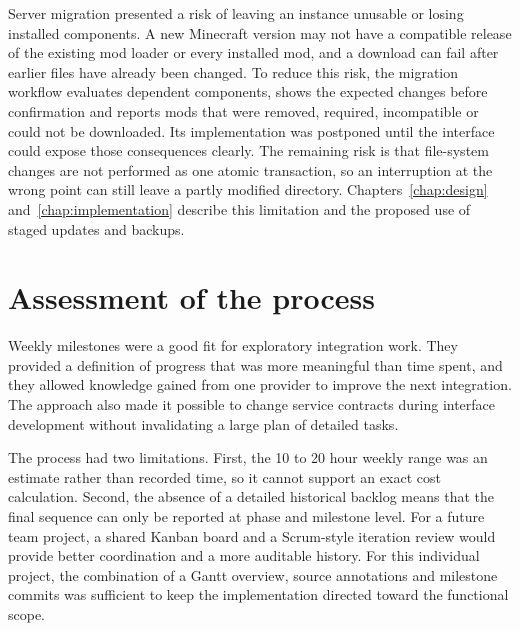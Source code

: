 Server migration presented a risk of leaving an instance unusable or losing installed components. A new Minecraft version may not have a compatible release of the existing mod loader or every installed mod, and a download can fail after earlier files have already been changed. To reduce this risk, the migration workflow evaluates dependent components, shows the expected changes before confirmation and reports mods that were removed, required, incompatible or could not be downloaded. Its implementation was postponed until the interface could expose those consequences clearly. The remaining risk is that file-system changes are not performed as one atomic transaction, so an interruption at the wrong point can still leave a partly modified directory. Chapters~\ref{chap:design} and~\ref{chap:implementation} describe this limitation and the proposed use of staged updates and backups.

\section{Assessment of the process}

Weekly milestones were a good fit for exploratory integration work. They provided a definition of progress that was more meaningful than time spent, and they allowed knowledge gained from one provider to improve the next integration. The approach also made it possible to change service contracts during interface development without invalidating a large plan of detailed tasks.

The process had two limitations. First, the 10 to 20 hour weekly range was an estimate rather than recorded time, so it cannot support an exact cost calculation. Second, the absence of a detailed historical backlog means that the final sequence can only be reported at phase and milestone level. For a future team project, a shared Kanban board and a Scrum-style iteration review would provide better coordination and a more auditable history. For this individual project, the combination of a Gantt overview, source annotations and milestone commits was sufficient to keep the implementation directed toward the functional scope.

